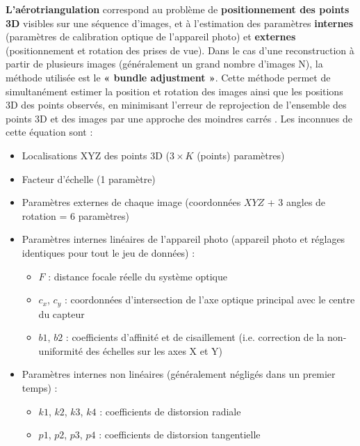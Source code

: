 \textbf{L’aérotriangulation} correspond au problème de \textbf{positionnement des points 3D} visibles sur une séquence d’images, et à l’estimation des paramètres \textbf{internes} (paramètres de calibration optique de l’appareil photo) et \textbf{externes} (positionnement et rotation des prises de vue). Dans le cas d’une reconstruction à partir de plusieurs images (généralement un grand nombre d’images N), la méthode utilisée est le \textbf{« bundle adjustment »}. Cette méthode permet de simultanément estimer la position et rotation des images ainsi que les positions 3D des points observés, en minimisant l’erreur de reprojection de l’ensemble des points 3D et des images par une approche des moindres carrés \citep{forstner_photogrammetric_2016}. Les inconnues de cette équation sont :

\begin{itemize}
    \item Localisations XYZ des points 3D ($3 \times K$ (points) paramètres)
    
    \item Facteur d’échelle (1 paramètre)
    
    \item Paramètres externes de chaque image (coordonnées $XYZ$ + 3 angles de rotation = 6 paramètres)
    
    \item Paramètres internes linéaires de l’appareil photo (appareil photo et réglages identiques pour tout le jeu de données) :
    
    \begin{itemize}
        \item $F$ : distance focale réelle du système optique
        
        \item $c_x$, $c_y$ : coordonnées d’intersection de l’axe optique principal avec le centre du capteur
        
        \item $b1$, $b2$ : coefficients d’affinité et de cisaillement (i.e. correction de la non-uniformité des échelles sur les axes X et Y)
    \end{itemize}
    
    \item Paramètres internes non linéaires (généralement négligés dans un premier temps) :
    
    \begin{itemize}
        \item $k1$, $k2$, $k3$, $k4$ : coefficients de distorsion radiale
        
        \item $p1$, $p2$, $p3$, $p4$ : coefficients de distorsion tangentielle
    \end{itemize}
\end{itemize}

